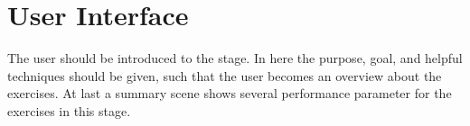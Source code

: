 \section{User Interface}\label{5_4_userInterface}
The user should be introduced to the stage. In here the purpose, goal, and helpful techniques should be given, such that the user becomes an overview about the exercises. At last a summary scene shows several performance parameter for the exercises in this stage.

